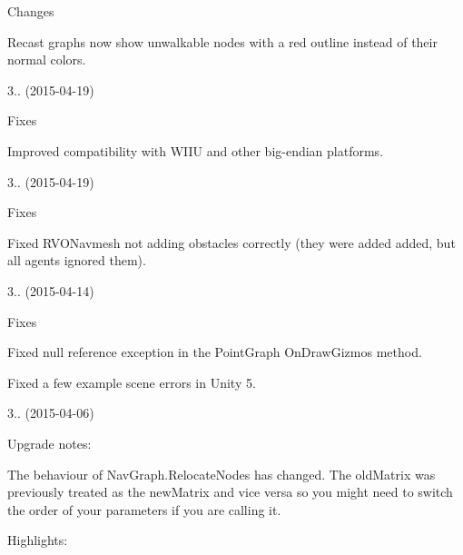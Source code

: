 \begin{DoxyItemize}
\begin{DoxyItemize}
\begin{DoxyItemize}
\end{DoxyItemize}
\item Changes
\begin{DoxyItemize}
\item Recast graphs now show unwalkable nodes with a red outline instead of their normal colors.
\end{DoxyItemize}
\end{DoxyItemize}
\item 3.. (2015-\/04-\/19)
\begin{DoxyItemize}
\item Fixes
\begin{DoxyItemize}
\item Improved compatibility with W\+I\+IU and other big-\/endian platforms.
\end{DoxyItemize}
\end{DoxyItemize}
\item 3.. (2015-\/04-\/19)
\begin{DoxyItemize}
\item Fixes
\begin{DoxyItemize}
\item Fixed R\+V\+O\+Navmesh not adding obstacles correctly (they were added added, but all agents ignored them).
\end{DoxyItemize}
\end{DoxyItemize}
\item 3.. (2015-\/04-\/14)
\begin{DoxyItemize}
\item Fixes
\begin{DoxyItemize}
\item Fixed null reference exception in the Point\+Graph On\+Draw\+Gizmos method.
\item Fixed a few example scene errors in Unity 5.
\end{DoxyItemize}
\end{DoxyItemize}
\item 3.. (2015-\/04-\/06)
\begin{DoxyItemize}
\item Upgrade notes\+:
\begin{DoxyItemize}
\item The behaviour of Nav\+Graph.\+Relocate\+Nodes has changed. The old\+Matrix was previously treated as the new\+Matrix and vice versa so you might need to switch the order of your parameters if you are calling it.
\end{DoxyItemize}
\item Highlights\+:

\end{DoxyItemize}
\end{DoxyItemize}
